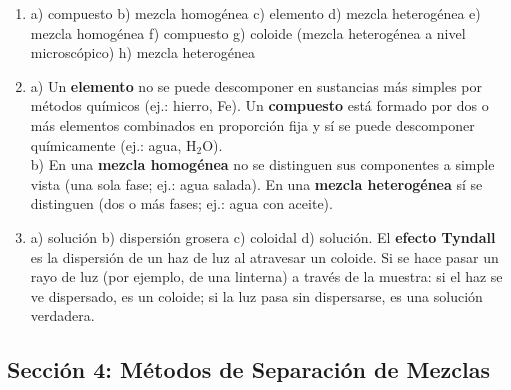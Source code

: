 \documentclass[12pt, letterpaper]{article}
\begin{document}
  \begin{enumerate}[leftmargin=*, label=\textbf{\arabic*.}]
    \item a) compuesto \quad b) mezcla homogénea \quad c) elemento \quad d) mezcla heterogénea \quad e) mezcla homogénea \quad f) compuesto \quad g) coloide (mezcla heterogénea a nivel microscópico) \quad h) mezcla heterogénea

    \item a) Un \textbf{elemento} no se puede descomponer en sustancias más simples por métodos químicos (ej.: hierro, Fe). Un \textbf{compuesto} está formado por dos o más elementos combinados en proporción fija y sí se puede descomponer químicamente (ej.: agua, H$_2$O).
          \\[2pt]
          b) En una \textbf{mezcla homogénea} no se distinguen sus componentes a simple vista (una sola fase; ej.: agua salada). En una \textbf{mezcla heterogénea} sí se distinguen (dos o más fases; ej.: agua con aceite).

    \item a) solución \quad b) dispersión grosera \quad c) coloidal \quad d) solución.
          El \textbf{efecto Tyndall} es la dispersión de un haz de luz al atravesar un coloide. Si se hace pasar un rayo de luz (por ejemplo, de una linterna) a través de la muestra: si el haz se ve dispersado, es un coloide; si la luz pasa sin dispersarse, es una solución verdadera.
  \end{enumerate}

  \newpage

  \subsection*{Sección 4: Métodos de Separación de Mezclas}
\end{document}
